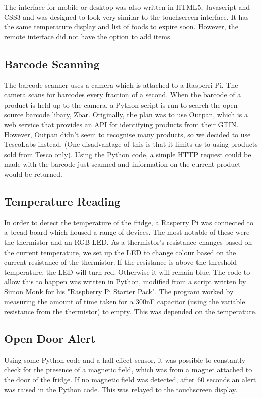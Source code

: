 \documentclass[10pt]{article}
\begin{document}
The interface for mobile or desktop was also written in HTML5, Javascript and CSS3 and was designed to look very similar to the touchscreen interface. It has the same temperature display and list of foods to expire soon. However, the remote interface did not have the option to add items.

\subsection{Barcode Scanning}
The barcode scanner uses a camera which is attached to a Rasperri Pi. The camera scans for barcodes every fraction of a second. When the barcode of a product is held up to the camera, a Python script is run to search the open-source barcode libary, Zbar. Originally, the plan was to use Outpan, which is a web service that provides an API for identifying products from their GTIN. However, Outpan didn't seem to recognise many products, so we decided to use TescoLabs instead. (One disadvantage of this is that it limits us to using products sold from Tesco only). Using the Python code, a simple HTTP request could be made with the barcode just scanned and information on the current product would be returned.

\subsection{Temperature Reading}
In order to detect the temperature of the fridge, a Rasperry Pi was connected to a bread board which housed a range of devices. The most notable of these were the thermistor and an RGB LED. As a thermistor's resistance changes based on the current temperature, we set up the LED to change colour based on the current resistance of the thermistor. If the resistance is above the threshold temperature, the LED will turn red. Otherwise it will remain blue. The code to allow this to happen was written in Python, modified from a script written by Simon Monk for his "Raspberry Pi Starter Pack". The program worked by measuring the amount of time taken for a 300nF capacitor (using the variable resistance from the thermistor) to empty. This was depended on the temperature.

\subsection{Open Door Alert}
Using some Python code and a hall effect sensor,  it was possible to constantly check for the presence of a magnetic field, which was from a magnet attached to the door of the fridge. If no magnetic field was detected, after 60 seconds an alert was raised in the Python code. This was relayed to the touchscreen display.
\end{document}

